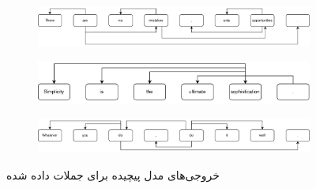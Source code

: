 \documentclass[12pt, a4paper]{article}
\begin{document}
\begin{figure}[t]
    \centering
    \begin{subfigure}{0.9\linewidth}
        \centering
        \includegraphics[width=0.8\linewidth]{images/s1.png}
        \caption{}
    \end{subfigure}
    \centering
    \begin{subfigure}{0.9\linewidth}
        \centering
        \includegraphics[width=0.8\linewidth]{images/s2.png}
        \caption{}
    \end{subfigure}
    \begin{subfigure}{0.9\linewidth}
        \centering
        \includegraphics[width=0.8\linewidth]{images/s3.png}
        \caption{}
    \end{subfigure}
    \caption{خروجی‌های مدل پیچیده برای جملات داده شده}
\end{figure}
\end{document}
